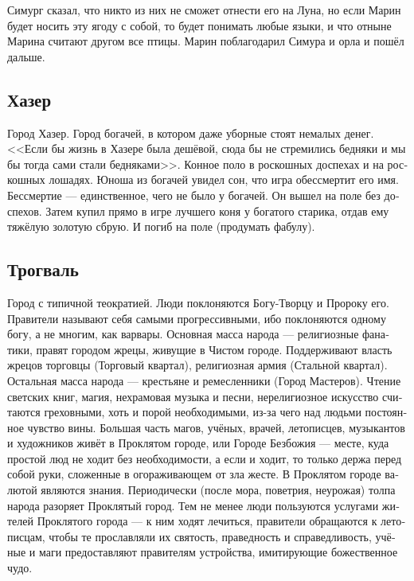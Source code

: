 \documentclass[a4paper,12pt,fleqn]{book}\usepackage{cooltooltips}\usepackage{polyglossia}\setdefaultlanguage[babelshorthands=true]{russian}\setotherlanguage{english}\defaultfontfeatures{Ligatures=TeX,Mapping=tex-text} \usepackage{xcolor}\definecolor{lightgray}{HTML}{bbbbbb}\color{lightgray}\newcommand{\ml}[3]{\textenglish{\textcolor{black}{#3}}}
\begin{document}
{Симург сказал, что никто из них не сможет отнести его на Луна, но если Марин будет носить эту ягоду с собой, то будет понимать любые языки, и что отныне Марина считают другом все птицы.
Марин поблагодарил Симура и орла и пошёл дальше.

\subsection{Хазер}

Город Хазер.
Город богачей, в котором даже уборные стоят немалых денег.
<<Если бы жизнь в Хазере была дешёвой, сюда бы не стремились бедняки и мы бы тогда сами стали бедняками>>.
Конное поло в роскошных доспехах и на роскошных лошадях.
Юноша из богачей увидел сон, что игра обессмертит его имя.
Бессмертие --- единственное, чего не было у богачей.
Он вышел на поле без доспехов.
Затем купил прямо в игре лучшего коня у богатого старика, отдав ему тяжёлую золотую сбрую.
И погиб на поле (продумать фабулу).

\subsection{Трогваль}

Город с типичной теократией.
Люди поклоняются Богу-Творцу и Пророку его.
Правители называют себя самыми прогрессивными, ибо поклоняются одному богу, а не многим, как варвары.
Основная масса народа --- религиозные фанатики, правят городом жрецы, живущие в Чистом городе.
Поддерживают власть жрецов торговцы (Торговый квартал), религиозная армия (Стальной квартал).
Остальная масса народа --- крестьяне и ремесленники (Город Мастеров).
Чтение светских книг, магия, нехрамовая музыка и песни, нерелигиозное искусство считаются греховными, хоть и порой необходимыми, из-за чего над людьми постоянное чувство вины.
Большая часть магов, учёных, врачей, летописцев, музыкантов и художников живёт в Проклятом городе, или Городе Безбожия --- месте, куда простой люд не ходит без необходимости, а если и ходит, то только держа перед собой руки, сложенные в огораживающем от зла жесте.
В Проклятом городе валютой являются знания.
Периодически (после мора, поветрия, неурожая) толпа народа разоряет Проклятый город.
Тем не менее люди пользуются услугами жителей Проклятого города --- к ним ходят лечиться, правители обращаются к летописцам, чтобы те прославляли их святость, праведность и справедливость, учёные и маги предоставляют правителям устройства, имитирующие божественное чудо.

}
\end{document}
